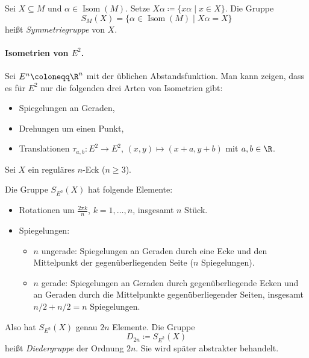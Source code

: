 \documentclass[11pt]{article}
\begin{document}
\begin{definition}[Symmetriegruppe]\Theorem
  Sei $X \subseteq M$ und $\alpha \in \operatorname{Isom}(M)$. Setze $X\alpha \coloneqq \{ x\alpha \mid x \in X \}$. Die Gruppe
  \[ S_M(X) = \{ \alpha \in \operatorname{Isom}(M) \mid X\alpha = X \} \]
  heißt \emph{Symmetriegruppe} von $X$.
\end{definition}


\paragraph{Isometrien von $E^2$.}
Sei $E^n \coloneqq \R^n$ mit der üblichen Abstandsfunktion.
Man kann zeigen, dass es für $E^2$ nur die folgenden drei Arten von Isometrien gibt:
\begin{itemize}
  \item Spiegelungen an Geraden,
  \item Drehungen um einen Punkt,
  \item Translationen $\tau_{a,b}\colon E^2 \to E^2$, $(x, y) \mapsto (x + a, y + b)$ mit $a, b \in \R$.
\end{itemize}

\begin{example}[Diedergruppe]
  Sei $X$ ein reguläres $n$-Eck ($n \ge 3$).
  \begin{center}
  \end{center}
  Die Gruppe $S_{E^2}(X)$ hat folgende Elemente:
  \begin{itemize}
    \item Rotationen um $\frac{2\pi k}{n}$, $k = 1, \dots, n$, insgesamt $n$ Stück.
    \item Spiegelungen:
      \begin{itemize}
        \item $n$ ungerade: Spiegelungen an Geraden durch eine Ecke und den Mittelpunkt der gegenüberliegenden Seite ($n$ Spiegelungen).
        \item $n$ gerade: Spiegelungen an Geraden durch gegenüberliegende Ecken und an Geraden durch die Mittelpunkte gegenüberliegender Seiten, insgesamt $n/2 + n/2 = n$ Spiegelungen.
      \end{itemize}
  \end{itemize}
  Also hat $S_{E^2}(X)$ genau $2n$ Elemente. Die Gruppe
  \[ D_{2n} \coloneqq S_{E^2}(X) \]
  heißt \emph{Diedergruppe} der Ordnung $2n$. Sie wird später abstrakter behandelt.
\end{example}
\end{document}
